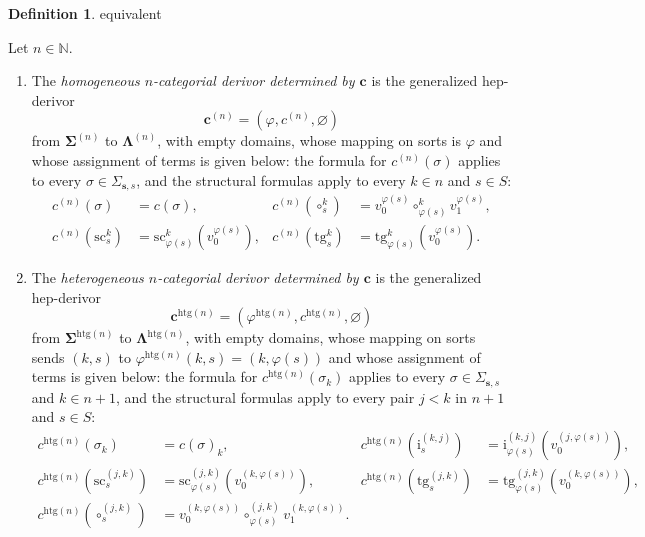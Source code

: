 \documentclass[a4paper, reqno]{amsbook}
\makeatletter
\newcommand{\sig}[1]{\mathbf{#1}}             %
\newcommand{\htg}{\mathrm{htg}}                %
\newcommand{\src}{\mathrm{sc}}
\newcommand{\tgt}{\mathrm{tg}}
\theoremstyle{plain}
\theoremstyle{definition}
\newtheorem{definition}[theorem]{Definition}
\newcommand*{\CA@leanpending}{}
\newcommand*{\CA@leanrelation}{}
\newcommand*{\lean}[2]{%
  \ifcsname\string\color@lean@#1\endcsname\else
    \PackageError{main}{Unknown relation `#1' in \string\lean}{Use equivalent, weaker or stronger.}%
  \fi
  \gdef\CA@leanrelation{#1}%
  \gdef\CA@leanpending{#2}}
\makeatother
\begin{document}
\begin{definition}\label{DChangeSigDerivor}\lean{equivalent}{ChangeOfSignature.homogeneous,ChangeOfSignature.heterogeneous}
Let $n\in\mathbb{N}$.
\begin{enumerate}
\item The \emph{homogeneous $n$-categorial derivor determined by $\mathbf{c}$} is the generalized hep-derivor
$$
\mathbf{c}^{(n)}=\left(\varphi,c^{(n)},\varnothing\right)
$$
from $\sig{\Sigma}^{(n)}$ to $\sig{\Lambda}^{(n)}$, with empty domains, whose mapping on sorts is $\varphi$ and whose assignment of terms is given below: the formula for $c^{(n)}(\sigma)$ applies to every $\sigma\in\Sigma_{\mathbf{s},s}$, and the structural formulas apply to every $k\in n$ and $s\in S$:
\begin{align*}
c^{(n)}(\sigma)&=c(\sigma), &
c^{(n)}(\circ^{k}_{s})&=v^{\varphi(s)}_{0}\circ^{k}_{\varphi(s)}v^{\varphi(s)}_{1},\\
c^{(n)}(\src^{k}_{s})&=\src^{k}_{\varphi(s)}\left(v^{\varphi(s)}_{0}\right), &
c^{(n)}(\tgt^{k}_{s})&=\tgt^{k}_{\varphi(s)}\left(v^{\varphi(s)}_{0}\right).
\end{align*}
\item The \emph{heterogeneous $n$-categorial derivor determined by $\mathbf{c}$} is the generalized hep-derivor
$$
\mathbf{c}^{\htg(n)}=\left(\varphi^{\htg(n)},c^{\htg(n)},\varnothing\right)
$$
from $\sig{\Sigma}^{\htg(n)}$ to $\sig{\Lambda}^{\htg(n)}$, with empty domains, whose mapping on sorts sends $(k,s)$ to $\varphi^{\htg(n)}(k,s)=(k,\varphi(s))$ and whose assignment of terms is given below: the formula for $c^{\htg(n)}(\sigma_k)$ applies to every $\sigma\in\Sigma_{\mathbf{s},s}$ and $k\in n+1$, and the structural formulas apply to every pair $j<k$ in $n+1$ and $s\in S$:
\begin{align*}
c^{\htg(n)}(\sigma_{k})&=c(\sigma)_{k}, &
c^{\htg(n)}(\mathrm{i}^{(k,j)}_{s})&=\mathrm{i}^{(k,j)}_{\varphi(s)}\left(v^{(j,\varphi(s))}_{0}\right),\\
c^{\htg(n)}(\src^{(j,k)}_{s})&=\src^{(j,k)}_{\varphi(s)}\left(v^{(k,\varphi(s))}_{0}\right), &
c^{\htg(n)}(\tgt^{(j,k)}_{s})&=\tgt^{(j,k)}_{\varphi(s)}\left(v^{(k,\varphi(s))}_{0}\right),\\
c^{\htg(n)}(\circ^{(j,k)}_{s})&=v^{(k,\varphi(s))}_{0}\circ^{(j,k)}_{\varphi(s)}v^{(k,\varphi(s))}_{1}.
\end{align*}
\end{enumerate}
\end{definition}
\end{document}
